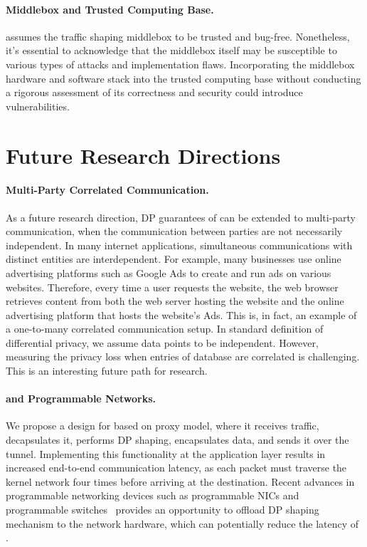 \paragraph{Middlebox and Trusted Computing Base.}
{\sys} assumes the traffic shaping middlebox to be trusted and bug-free.
Nonetheless, it's essential to acknowledge that the middlebox itself may be susceptible to various types of attacks and implementation flaws. Incorporating the middlebox hardware and software stack into the trusted computing base without conducting a rigorous assessment of its correctness and security could introduce vulnerabilities.

\section{Future Research Directions}\label{sec:conclusion-future}
\paragraph{Multi-Party Correlated Communication.}
As a future research direction, DP guarantees of {\sys} can be extended to multi-party communication, when the communication between parties are not necessarily independent.
In many internet applications,  simultaneous communications with distinct entities are interdependent.
For example, many businesses use online advertising platforms such as Google Ads to create and run ads on various websites.
Therefore, every time a user requests the website, the web browser retrieves content from both the web server hosting the website and the online advertising platform that hosts the website's Ads.   
This is, in fact, an example of a one-to-many correlated communication setup.
In standard definition of differential privacy, we assume data points to be independent.  
However, measuring the privacy loss when entries of database are correlated is challenging. 
This is an interesting future path for research.

\paragraph{{\sys} and Programmable Networks.}
We propose a design for {\sys} based on proxy model, where it receives traffic, decapsulates it, performs DP shaping, encapsulates data, and sends it over the tunnel.
Implementing this functionality at the application layer results in increased end-to-end communication latency, as each packet must traverse the kernel network four times before arriving at the destination.
Recent advances in programmable networking devices such as programmable NICs and programmable switches~\cite{meier2022ditto} provides an opportunity to offload DP shaping mechanism to the network hardware, which can potentially reduce the latency of {\sys}.


